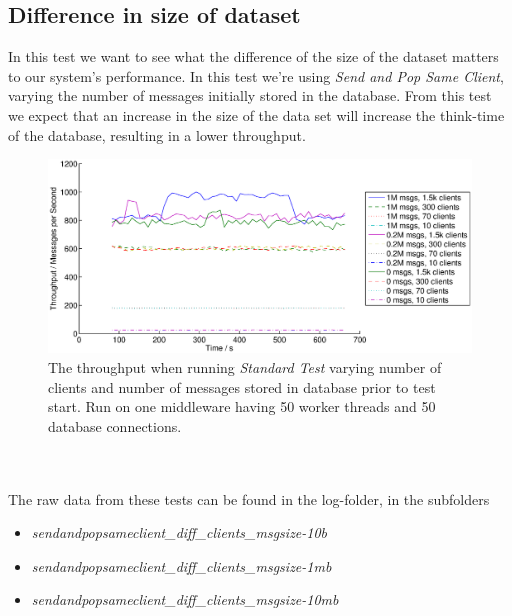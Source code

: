 \documentclass{article}
\begin{document}
        \subsection{Difference in size of dataset}
            \label{sec:difference_in_size_of_dataset}
            In this test we want to see what the difference of the size of the dataset matters to our system's performance. In this test we're using \textit{Send and Pop Same Client}, varying the number of messages initially stored in the database. From this test we expect that an increase in the size of the data set will increase the think-time of the database, resulting in a lower throughput.
            \begin{figure}[H]
                \centerline{\includegraphics[scale=0.55]{msg_db_clients}}
                \caption{The throughput when running \textit{Standard Test} varying number of clients and number of messages stored in database prior to test start. Run on one middleware having 50 worker threads and 50 database connections.}
                \label{fig:msg_db_clients}
            \end{figure}
            ~\\
            \\
            The raw data from these tests can be found in the log-folder, in the subfolders
            \begin{itemize}
                \item \textit{sendandpopsameclient\_diff\_clients\_msgsize-10b}
                \item \textit{sendandpopsameclient\_diff\_clients\_msgsize-1mb}
                \item \textit{sendandpopsameclient\_diff\_clients\_msgsize-10mb}
            \end{itemize}
\end{document}
